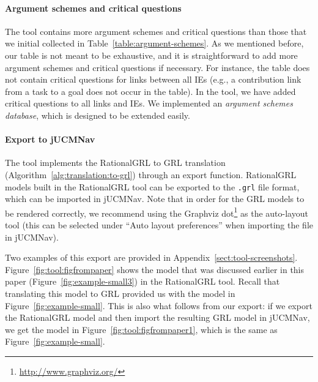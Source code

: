 \paragraph{Argument schemes and critical questions} The tool contains more argument schemes and critical questions than those that we initial collected in Table~\ref{table:argument-schemes}. As we mentioned before, our table is not meant to be exhaustive, and it is straightforward to add more argument schemes and critical questions if necessary. For instance, the table does not contain critical questions for links between all IEs (e.g., a contribution link from a task to a goal does not occur in the table). In the tool, we have added critical questions to all links and IEs. We implemented an \emph{argument schemes database}, which is designed to be extended easily.


\paragraph{Export to jUCMNav} The tool implements the RationalGRL to GRL translation (Algorithm~\ref{alg:translation:to-grl}) through an export function. RationalGRL models built in the RationalGRL tool can be exported to the \texttt{.grl} file format, which can be imported in jUCMNav. Note that in order for the GRL models to be rendered correctly, we recommend using the Graphviz dot\footnote{\url{http://www.graphviz.org/}} as the auto-layout tool (this can be selected under ``Auto layout preferences'' when importing the file in jUCMNav).

Two examples of this export are provided in Appendix~\ref{sect:tool-screenshots}. Figure~\ref{fig:tool:figfrompaper} shows the model that was discussed earlier in this paper (Figure~\ref{fig:example-small3}) in the RationalGRL tool. Recall that translating this model to GRL provided us with the model in Figure~\ref{fig:example-small}. This is also what follows from our export: if we export the RationalGRL model and then import the resulting GRL model in jUCMNav, we get the model in Figure~\ref{fig:tool:figfrompaper1}, which is the same as Figure~\ref{fig:example-small}.

